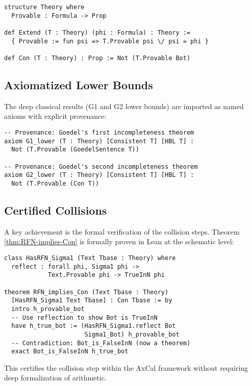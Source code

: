 \documentclass[11pt]{article}
\begin{document}
\begin{lstlisting}[language=Lean, caption={Core Theory Interface}]
structure Theory where
  Provable : Formula -> Prop

def Extend (T : Theory) (phi : Formula) : Theory :=
  { Provable := fun psi => T.Provable psi \/ psi = phi }

def Con (T : Theory) : Prop := Not (T.Provable Bot)
\end{lstlisting}

\subsection{Axiomatized Lower Bounds}
The deep classical results (G1 and G2 lower bounds) are imported as named axioms with explicit provenance:

\begin{lstlisting}[language=Lean, caption={Named Classical Axioms}]
-- Provenance: Goedel's first incompleteness theorem
axiom G1_lower (T : Theory) [Consistent T] [HBL T] :
  Not (T.Provable (GoedelSentence T))

-- Provenance: Goedel's second incompleteness theorem  
axiom G2_lower (T : Theory) [Consistent T] [HBL T] :
  Not (T.Provable (Con T))
\end{lstlisting}

\subsection{Certified Collisions}
A key achievement is the formal verification of the collision steps. Theorem \ref{thm:RFN-implies-Con} is formally proven in Lean at the schematic level:

\begin{lstlisting}[language=Lean, caption={Schematic Proof of RFN implies Con}]
class HasRFN_Sigma1 (Text Tbase : Theory) where
  reflect : forall phi, Sigma1 phi -> 
            Text.Provable phi -> TrueInN phi

theorem RFN_implies_Con (Text Tbase : Theory) 
  [HasRFN_Sigma1 Text Tbase] : Con Tbase := by
  intro h_provable_bot
  -- Use reflection to show Bot is TrueInN
  have h_true_bot := (HasRFN_Sigma1.reflect Bot 
                      Sigma1_Bot) h_provable_bot
  -- Contradiction: Bot_is_FalseInN (now a theorem)
  exact Bot_is_FalseInN h_true_bot
\end{lstlisting}

This certifies the collision step within the AxCal framework without requiring deep formalization of arithmetic.
\end{document}
